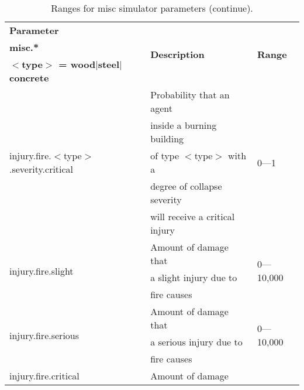 \documentclass{article}
\begin{document}
\begin{table}[htb]
\caption{Ranges for misc simulator parameters (continue).}
\label{tab:13}
\centering
\begin{tabular}{lll}
  \hline
  \textbf{Parameter}                                        &
  \multirow{3}{*}{\textbf{Description}} & \multirow{3}{*}{\textbf{Range}}\\
  \textbf{misc.*}                                           &
                                        & \\
  \textbf{$<$type$>$ = wood$|$steel$|$concrete}             &
                                        & \\
  \hline
  \multirow{5}{*}{injury.fire.$<$type$>$.severity.critical} & Probability that
  an agent                              & \multirow{5}{*}{0---1}\\
                                                            & inside a burning
  building                              & \\
                                                            & of type $<$type$>$
  with a                                & \\
                                                            & degree of collapse
  severity                              & \\
                                                            & will receive a
  critical injury                       & \\
  \hline
  \multirow{3}{*}{injury.fire.slight}                       & Amount of damage
  that                                  & \multirow{3}{*}{0---10,000}\\
                                                            & a slight injury
  due to                                & \\
                                                            & fire causes
                                        & \\
  \hline
  \multirow{3}{*}{injury.fire.serious}                      & Amount of damage
  that                                  & \multirow{3}{*}{0---10,000}\\
                                                            & a serious injury
  due to                                & \\
                                                            & fire causes
                                        & \\
  \hline
  \multirow{3}{*}{injury.fire.critical}                     & Amount of damage

\end{tabular}
\end{table}
\end{document}

